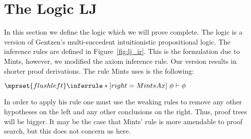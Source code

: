\documentclass{article}
\begin{document}
\section{The Logic LJ}
\label{sec:the_logic_lj}
In this section we define the logic which we will prove complete.  The logic is a version of
Gentzen's multi-succedent intuitionistic propositional logic. The inference rules are defined
in Figure~\ref{fig:lj_ir}. This is the formulation due to 
Mints, however, we modified the axiom inference rule.  Our version results in shorter proof derivations. 
The rule Mints uses is the following:
\begin{center}
  \begin{math}
    $$\mprset{flushleft}
    \inferrule* [right=MintsAx] {
      \ 
    }{\phi \vdash \phi}
  \end{math}
\end{center}
In order to apply his rule one must use the weaking rules to remove any other hypotheses on the left and
any other conclusions on the right.  Thus, proof trees will be bigger.  It may be the case that Mints' 
rule is more amendable to proof search, but this does not concern us here.
\end{document}
